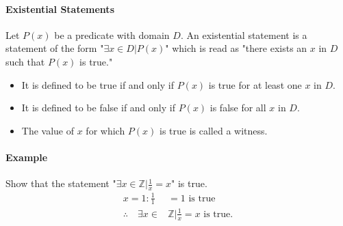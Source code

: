\pagebreak

\paragraph*{Existential Statements}
Let $P(x)$ be a predicate with domain $D$. An existential statement is a statement of the form
"$\exists x \in D | P(x)$" which is read as "there exists an $x$ in $D$ such that $P(x)$ is true."
\begin{itemize}
    \item It is defined to be true if and only if $P(x)$ is true for at least one $x$ in $D$.
    \item It is defined to be false if and only if $P(x)$ is false for all $x$ in $D$.
    \item The value of $x$ for which $P(x)$ is true is called a witness.
\end{itemize}

\paragraph*{Example}
Show that the statement "$\exists x \in \mathbb{Z} | \frac{1}{x} = x$" is true.
\begin{align*}
    x = 1: \frac{1}{1} &= 1 \text{ is true}\\
    \therefore \quad \exists x \in &\mathbb{Z} | \frac{1}{x} = x \text{ is true.}
\end{align*}